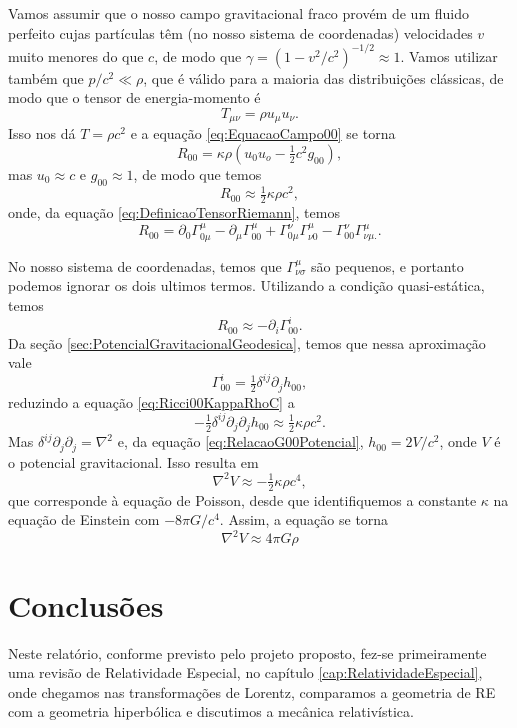 Vamos assumir que o nosso campo gravitacional fraco provém de um fluido perfeito cujas partículas têm (no nosso sistema de coordenadas) velocidades $v$ muito menores do que $c$, de modo que $\gamma = (1-v^2/c^2)^{-1/2}\approx 1$. Vamos utilizar também que $p/c^2 \ll \rho$, que é válido para a maioria das distribuições clássicas, de modo que o tensor de energia-momento é
\[
	T_{\mu\nu}=\rho u_\mu u_\nu .
\]
Isso nos dá $T=\rho c^2$ e a equação \ref{eq:EquacaoCampo00} se torna
\[
	R_{00}=\kappa\rho(u_0u_o-\tfrac{1}{2}c^2g_{00}),
\]
mas $u_0 \approx c$ e $g_{00}\approx 1$, de modo que temos
\begin{equation}\label{eq:Ricci00KappaRhoC}
	R_{00}\approx\tfrac{1}{2}\kappa\rho c^2,
\end{equation}
onde, da equação \eqref{eq:DefinicaoTensorRiemann}, temos 
\begin{equation*}
	R_{00}=\partial_0\Gamma^\mu_{0\mu}-\partial_\mu\Gamma^\mu_{00}+\Gamma^\nu_{0\mu}\Gamma^\mu_{\nu0}-\Gamma^\nu_{00}\Gamma^\mu_{\nu\mu.
	} .
\end{equation*}

No nosso sistema de coordenadas, temos que $\Gamma^\mu_{\nu\sigma}$ são pequenos, e portanto podemos ignorar os dois ultimos termos. Utilizando a condição quasi-estática, temos
\[
	R_{00}\approx-\partial_i\Gamma^i_{00} .
\]
Da seção \ref{sec:PotencialGravitacionalGeodesica}, temos que nessa aproximação vale
\[
	\Gamma^i_{00}=\tfrac{1}{2}\delta^{ij}\partial_j h_{00},
\]
reduzindo a equação \eqref{eq:Ricci00KappaRhoC} a
\[
	-\tfrac{1}{2}\delta^{ij}\partial_j\partial_j h_{00}\approx\tfrac{1}{2}\kappa\rho c^2.
\]
Mas $\delta^{ij}\partial_j\partial_j=\nabla^2$ e, da equação \eqref{eq:RelacaoG00Potencial}, $h_{00}=2V/c^2$, onde $V$ é o potencial gravitacional. Isso resulta em 
\[
	\nabla^2V\approx-\tfrac{1}{2}\kappa\rho c^4,
\]
que corresponde à equação de Poisson, desde que identifiquemos a constante $\kappa$ na equação de Einstein com $-8\pi G/c^4$. Assim, a equação se torna
\begin{equation}
	\boxed{
		\nabla^2V\approx 4\pi G\rho
	}
\end{equation}

\section*{Conclusões}

Neste relatório, conforme previsto pelo projeto proposto, fez-se primeiramente uma revisão de Relatividade Especial, no capítulo \ref{cap:RelatividadeEspecial}, onde chegamos nas transformações de Lorentz, comparamos a geometria de RE com a geometria hiperbólica e discutimos a mecânica relativística.

